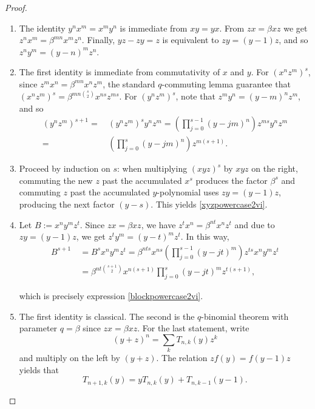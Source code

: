 \documentclass{amsart}
\theoremstyle{definition}
\theoremstyle{remark}
\numberwithin{equation}{section}
\begin{document}
\begin{proof}
\begin{enumerate}
\item [\rm (1)] The identity $y^n x^m=x^m y^n$ is immediate from $xy=yx$. From $zx=\beta xz$ we get $z^n x^m=\beta^{mn}x^m z^n$. Finally, $yz-zy=z$ is equivalent to $zy=(y-1)z$, and so $z^n y^m=(y-n)^m z^n$.

\item [\rm (2)] The first identity is immediate from commutativity of $x$ and $y$. For $(x^n z^m)^s$, since $z^m x^n=\beta^{mn}x^n z^m$, the standard $q$-commuting lemma guarantee that $(x^n z^m)^s=\beta^{mn\binom{s}{2}}x^{ns}z^{ms}$.
For $(y^n z^m)^s$, note that $z^m y^n=(y-m)^n z^m$, and so
\begin{align*}
 (y^n z^m)^{s+1} = &\, (y^n z^m)^s y^n z^m = \left(\prod_{j=0}^{s-1}(y-jm)^n\right)z^{ms}y^n z^m \\
 = &\, \left(\prod_{j=0}^{s}(y-jm)^n\right)z^{m(s+1)}.
\end{align*}

\item [\rm (3)] Proceed by induction on $s$:
when multiplying $(xyz)^s$ by $xyz$ on the right, commuting the new $z$ past the accumulated $x^s$ produces the factor $\beta^{s}$ and commuting $z$ past the accumulated $y$-polynomial uses $zy=(y-1)z$, producing the next factor $(y-s)$. This yields \eqref{xyzpowercase2vi}.

\item [\rm (4)] Let $B:=x^n y^m z^t$. Since $zx=\beta xz$, we have $z^t x^n=\beta^{nt}x^n z^t$ and due to $zy=(y-1)z$, we get $z^t y^m=(y-t)^m z^t$. In this way, 
\begin{align*}
B^{s+1} &\ =B^s x^n y^m z^t
=\beta^{nt s}x^{ns}\left(\prod_{j=0}^{s-1}(y-jt)^m\right)z^{ts} x^n y^m z^t \\
&\ =\beta^{nt\binom{s+1}{2}}x^{n(s+1)}\prod_{j=0}^{s}(y-jt)^m z^{t(s+1)},
\end{align*}

which is precisely expression \eqref{blockpowercase2vi}.

\item [\rm (5)] The first identity is classical. The second is the $q$-binomial theorem with parameter $q=\beta$
since $zx=\beta xz$. For the last statement, write
$$
(y+z)^n = \sum_k T_{n,k}(y)z^k
$$ 
and multiply on the left by $(y+z)$. The relation $z f(y)=f(y-1)z$ yields that 
$$
T_{n+1,k}(y)=yT_{n,k}(y)+T_{n,k-1}(y-1).
$$
\end{enumerate}
\end{proof}
\end{document}
